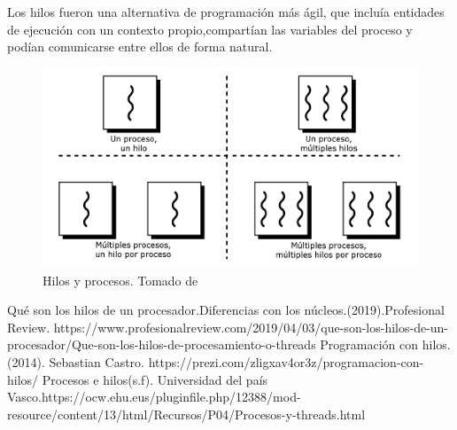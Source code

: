 \documentclass{report}   %
\begin{document}
Los hilos fueron una alternativa de programación más ágil, que incluía entidades de ejecución con un contexto propio,compartían las variables del proceso y podían comunicarse entre ellos de forma natural.\\
\begin{figure}[H]
      \centering
      \captionsetup{justification=centering}
      \includegraphics[scale=0.5]{Hilos.png}
      \caption{Hilos y procesos. Tomado de \cite{2}}
      \label{fig:Hilos}
   \end{figure}
\begin{thebibliography}{0}
   Qué son los hilos de un procesador.Diferencias con los núcleos.(2019).Profesional Review.
  https://www.profesionalreview.com/2019/04/03/que-son-los-hilos-de-un-procesador/Que-son-los-hilos-de-procesamiento-o-threads
   Programación con hilos.(2014). Sebastian Castro. https://prezi.com/zligxav4or3z/programacion-con-hilos/
   Procesos e hilos(s.f). Universidad del país Vasco.https://ocw.ehu.eus/pluginfile.php/12388/mod-resource/content/13/html/Recursos/P04/Procesos-y-threads.html
\end{thebibliography}
\end{document}
